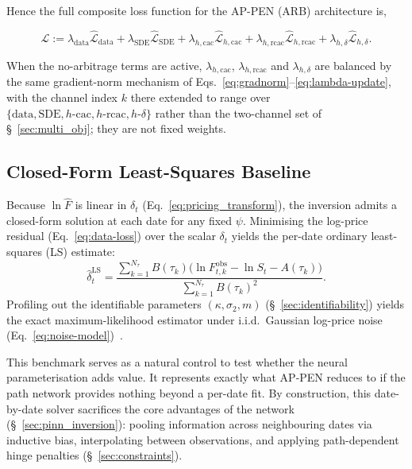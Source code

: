 \documentclass[11pt, a4paper]{article}
\begin{document}
Hence the full composite loss function for the AP-PEN (ARB) architecture is,

\begin{equation}
\hat{\mathcal{L}} :=
\lambda_{\text{data}} \hat{\mathcal{L}}_{\text{data}}
+ \lambda_{\text{SDE}} \hat{\mathcal{L}}_{\text{SDE}}
+ \lambda_{h,\text{cac}} \hat{\mathcal{L}}_{h,\text{cac}}
+ \lambda_{h,\text{rcac}} \hat{\mathcal{L}}_{h,\text{rcac}}
+ \lambda_{h,\delta} \hat{\mathcal{L}}_{h,\delta}.
\label{eq:composite-full}
\end{equation}

When the no-arbitrage terms are active, $\lambda_{h,\text{cac}}$, $\lambda_{h,\text{rcac}}$ and $\lambda_{h,\delta}$ are balanced by the same gradient-norm mechanism of Eqs.~\ref{eq:gradnorm}--\ref{eq:lambda-update}, with the channel index $k$ there extended to range over $\{\text{data}, \text{SDE}, h\text{-cac}, h\text{-rcac}, h\text{-}\delta\}$ rather than the two-channel set of \S~\ref{sec:multi_obj}; they are not fixed weights.

\subsection{Closed-Form Least-Squares Baseline}
\label{sec:ls_baseline}

Because $\ln \hat{F}$ is linear in $\delta_t$ (Eq.~\ref{eq:pricing_transform}), the inversion admits a closed-form solution at each date for any fixed $\psi$. Minimising the log-price residual (Eq.~\ref{eq:data-loss}) over the scalar $\delta_t$ yields the per-date ordinary least-squares (LS) estimate:
\begin{equation}
  \label{eq:ls_delta}
  \hat{\delta}^{\text{LS}}_t
  = \frac{\sum_{k=1}^{N_\tau} B(\tau_k)\big(
      \ln F^{\text{obs}}_{t,k} - \ln S_t - A(\tau_k)\big)}
         {\sum_{k=1}^{N_\tau} B(\tau_k)^2}.
\end{equation}
Profiling out the identifiable parameters $(\kappa, \sigma_2, m)$ (\S~\ref{sec:identifiability}) yields the exact maximum-likelihood estimator under i.i.d.\ Gaussian log-price noise (Eq.~\ref{eq:noise-model})~\cite{Schwartz1997TheHedging}.

This benchmark serves as a natural control to test whether the neural parameterisation adds value. It represents exactly what AP-PEN reduces to if the path network provides nothing beyond a per-date fit. By construction, this date-by-date solver sacrifices the core advantages of the network (\S~\ref{sec:pinn_inversion}): pooling information across neighbouring dates via inductive bias, interpolating between observations, and applying path-dependent hinge penalties (\S~\ref{sec:constraints}).
\end{document}
